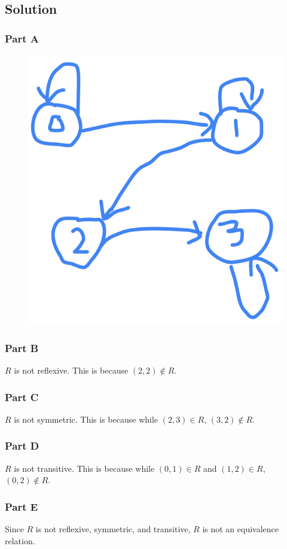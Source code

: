 \documentclass[table]{article}
\begin{document}
\subsection{Solution}
\subsubsection{Part A}
\begin{figure}[h!]
	\includegraphics[scale=.3]{images/Prob6a.png}
\end{figure}
\subsubsection{Part B}
$R$ is not reflexive. This is because $(2, 2) \not\in R$.
\subsubsection{Part C}
$R$ is not symmetric. This is because while $(2, 3) \in R$, $(3, 2) \not\in R$.
\subsubsection{Part D}
$R$ is not transitive. This is because while $(0, 1) \in R$ and $(1, 2) \in R$, $(0, 2) \not\in R$.
\subsubsection{Part E}
Since $R$ is not reflexive, symmetric, and transitive, $R$ is not an equivalence relation.
\end{document}
